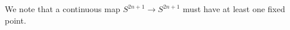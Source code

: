 \documentclass{article}
\begin{document}
\large 

\vspace{0.05in}


We note that a continuous map $S^{2n+1} \to S^{2n+1}$ must have at least one fixed point. 
\end{document}
